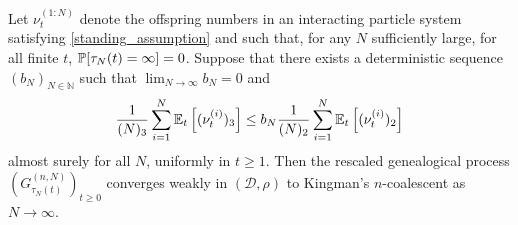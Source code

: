 \begin{theorem}\label{thm:weakconv}
Let $\nu_t^{(1:N)}$ denote the offspring numbers in an interacting particle system satisfying \textup{\ref{standing_assumption}} and such that, for any $N$ sufficiently large, for all finite $t$, $\mathbb{P}[ \tau_N(t) = \infty ] =0$. Suppose that there exists a deterministic sequence $(b_N)_{N\in\mathbb{N}}$ such that ${\lim}_{N\to\infty} b_N =0$ and%
\begin{equation}\label{eq:mainthmcondition2}
\frac{1}{(N)_3} \sum_{i = 1}^N \mathbb{E}_t\left[ (\nu_t^{(i)})_3 \right]  \leq b_N \frac{1}{(N)_2} \sum_{i = 1}^N \mathbb{E}_t\left[ (\nu_t^{(i)})_2 \right]
\end{equation}
almost surely for all $N$, uniformly in $t \geq 1$.
Then the rescaled genealogical process $(G_{\tau_N(t)}^{(n,N)})_{t\geq0}$ converges weakly in $(\mathcal{D}, \rho)$
to Kingman's $n$-coalescent as $N \to \infty$.
\end{theorem}

